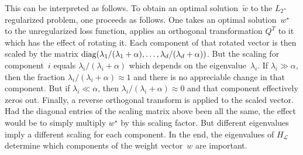 This can be interpreted as follows. To obtain an optimal solution~$\tilde{w}$ to 
the $L_2$-regularized problem, one proceeds as follows. One takes an optimal solution~$w^{\star}$ 
to the unregularized loss function, applies an orthogonal transformation $Q^{T}$ 
to it which has the effect of rotating it. Each component of that rotated vector 
is then scaled by the matrix 
$\operatorname{diag}(\lambda_1 / (\lambda_1 + \alpha), \ldots, \lambda_d / (\lambda_d + \alpha))$. But 
the scaling for component~$i$ equals $\lambda_i / (\lambda_i + \alpha)$ which 
depends on the eigenvalue~$\lambda_i$. If $\lambda_i \gg \alpha$, then the 
fraction $\lambda_i / (\lambda_i + \alpha) \approx 1$ and there 
is no appreciable change in that component. But if $\lambda_i \ll \alpha$, then 
$\lambda_i / (\lambda_i + \alpha) \approx 0$ and that component effectively zeros 
out. Finally, a reverse orthogonal transform is applied to the scaled 
vector. Had the diagonal entries of the scaling matrix above been all the same, 
the effect would be to simply multiply $w^{\star}$ by this scaling factor. But 
different eigenvalues imply a different scaling for each component. 
In the end, the eigenvalues of $H_{\mathscr{L}}$ determine which components 
of the weight vector~$w$ are important.
   
